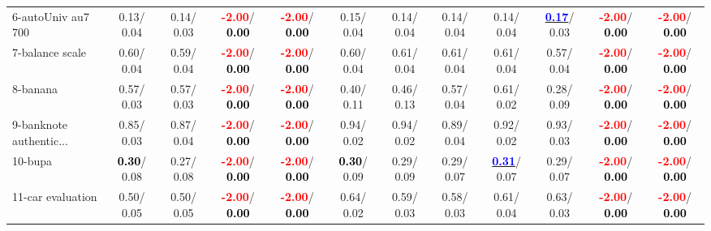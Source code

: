\begin{table}[h]
\begin{center}
{\begin{tabular}{lc|c|c|c|c|c|c|c|c|c|c}
6-autoUniv au7 700 &   0.13/  0.04 &   0.14/  0.03 & \textcolor{red}{\textbf{ -2.00}}/\textcolor{black}{\textbf{  0.00}} & \textcolor{red}{\textbf{ -2.00}}/\textcolor{black}{\textbf{  0.00}} &   0.15/  0.04 &   0.14/  0.04 &   0.14/  0.04 &   0.14/  0.04 & \underline{\textcolor{blue}{\textbf{  0.17}}}/  0.03 & \textcolor{red}{\textbf{ -2.00}}/\textcolor{black}{\textbf{  0.00}} & \textcolor{red}{\textbf{ -2.00}}/\textcolor{black}{\textbf{  0.00}} \\
7-balance scale &   0.60/  0.04 &   0.59/  0.04 & \textcolor{red}{\textbf{ -2.00}}/\textcolor{black}{\textbf{  0.00}} & \textcolor{red}{\textbf{ -2.00}}/\textcolor{black}{\textbf{  0.00}} &   0.60/  0.04 &   0.61/  0.04 &   0.61/  0.04 &   0.61/  0.04 &   0.57/  0.04 & \textcolor{red}{\textbf{ -2.00}}/\textcolor{black}{\textbf{  0.00}} & \textcolor{red}{\textbf{ -2.00}}/\textcolor{black}{\textbf{  0.00}} \\ \hline
8-banana &   0.57/  0.03 &   0.57/  0.03 & \textcolor{red}{\textbf{ -2.00}}/\textcolor{black}{\textbf{  0.00}} & \textcolor{red}{\textbf{ -2.00}}/\textcolor{black}{\textbf{  0.00}} &   0.40/  0.11 &   0.46/  0.13 &   0.57/  0.04 &   0.61/  0.02 &   0.28/  0.09 & \textcolor{red}{\textbf{ -2.00}}/\textcolor{black}{\textbf{  0.00}} & \textcolor{red}{\textbf{ -2.00}}/\textcolor{black}{\textbf{  0.00}} \\
9-banknote authentic... &   0.85/  0.03 &   0.87/  0.04 & \textcolor{red}{\textbf{ -2.00}}/\textcolor{black}{\textbf{  0.00}} & \textcolor{red}{\textbf{ -2.00}}/\textcolor{black}{\textbf{  0.00}} &   0.94/  0.02 &   0.94/  0.02 &   0.89/  0.04 &   0.92/  0.02 &   0.93/  0.03 & \textcolor{red}{\textbf{ -2.00}}/\textcolor{black}{\textbf{  0.00}} & \textcolor{red}{\textbf{ -2.00}}/\textcolor{black}{\textbf{  0.00}} \\
10-bupa & \textcolor{black}{\textbf{  0.30}}/  0.08 &   0.27/  0.08 & \textcolor{red}{\textbf{ -2.00}}/\textcolor{black}{\textbf{  0.00}} & \textcolor{red}{\textbf{ -2.00}}/\textcolor{black}{\textbf{  0.00}} & \textcolor{black}{\textbf{  0.30}}/  0.09 &   0.29/  0.09 &   0.29/  0.07 & \underline{\textcolor{blue}{\textbf{  0.31}}}/  0.07 &   0.29/  0.07 & \textcolor{red}{\textbf{ -2.00}}/\textcolor{black}{\textbf{  0.00}} & \textcolor{red}{\textbf{ -2.00}}/\textcolor{black}{\textbf{  0.00}} \\
11-car evaluation &   0.50/  0.05 &   0.50/  0.05 & \textcolor{red}{\textbf{ -2.00}}/\textcolor{black}{\textbf{  0.00}} & \textcolor{red}{\textbf{ -2.00}}/\textcolor{black}{\textbf{  0.00}} &   0.64/  0.02 &   0.59/  0.03 &   0.58/  0.03 &   0.61/  0.04 &   0.63/  0.03 & \textcolor{red}{\textbf{ -2.00}}/\textcolor{black}{\textbf{  0.00}} & \textcolor{red}{\textbf{ -2.00}}/\textcolor{black}{\textbf{  0.00}} \\

\end{tabular}}
\end{center}
\end{table}
